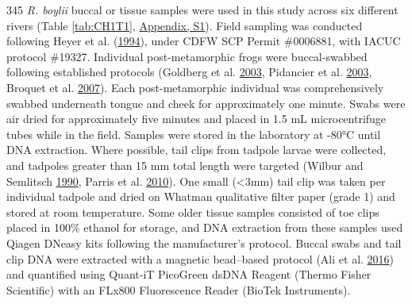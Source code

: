 \documentclass[twoside,12pt,final]{ucthesis-CA2012} %
\begin{document}
\begin{ucmainmatter}
345 \emph{R. boylii} buccal or tissue samples were used in this study
across six different rivers (Table \ref{tab:CH1T1},
\protect\hyperlink{supptables}{Appendix, S1}). Field sampling was
conducted following Heyer et al.
(\protect\hyperlink{ref-heyer_measuring_1994}{1994}), under CDFW SCP
Permit \#0006881, with IACUC protocol \#19327. Individual
post-metamorphic frogs were buccal-swabbed following established
protocols (Goldberg et al.
\protect\hyperlink{ref-goldberg_frogs_2003}{2003}, Pidancier et al.
\protect\hyperlink{ref-pidancier_buccal_2003}{2003}, Broquet et al.
\protect\hyperlink{ref-broquet_buccal_2007}{2007}). Each
post-metamorphic individual was comprehensively swabbed underneath
tongue and cheek for approximately one minute. Swabs were air dried for
approximately five minutes and placed in 1.5 mL microcentrifuge tubes
while in the field. Samples were stored in the laboratory at -80°C until
DNA extraction. Where possible, tail clips from tadpole larvae were
collected, and tadpoles greater than 15 mm total length were targeted
(Wilbur and Semlitsch
\protect\hyperlink{ref-wilbur_ecological_1990}{1990}, Parris et al.
\protect\hyperlink{ref-parris_assessing_2010}{2010}). One small
(\textless{}3mm) tail clip was taken per individual tadpole and dried on
Whatman qualitative filter paper (grade 1) and stored at room
temperature. Some older tissue samples consisted of toe clips placed in
100\% ethanol for storage, and DNA extraction from these samples used
Qiagen DNeasy kits following the manufacturer's protocol. Buccal swabs
and tail clip DNA were extracted with a magnetic bead--based protocol
(Ali et al. \protect\hyperlink{ref-ali_rad_2016}{2016}) and quantified
using Quant-iT PicoGreen dsDNA Reagent (Thermo Fisher Scientific) with
an FLx800 Fluorescence Reader (BioTek Instruments).
\begin{landscape}\begin{table}


\end{table}
\end{landscape}
\end{ucmainmatter}
\end{document}
